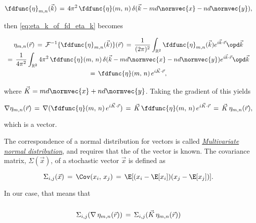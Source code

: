 {\begin{equation} \label{eq:fd_eta_one_dirac}
\fdfunc{\eta}_{m,n}(\vec{k}) \,=\, 4\pi^2\,\fdfunc{\eta}(m,\,n)\,\delta(\vec{k} - md\normvec{x} - nd\normvec{y}),
\end{equation}

then \eqref{eq:eta_k_of_fd_eta_k} becomes

\begin{equation}
\renewcommand*{\arraystretch}{1.5}
\begin{array}{c}
\displaystyle \eta_{m,n}(\vec{r}) \,=\, \mathcal{F}^{-1}\{\fdfunc{\eta}_{m,n}(\vec{k})\}(\vec{r}) \,=\, \frac{1}{(2\pi)^2} \int_{\mathbb{R}^2} \fdfunc{\eta}_{m,n}(\vec{k}) e^{i\vec{k}\cdot\vec{r}}\opd \vec{k} \\
\displaystyle =\, \frac{1}{4\pi^2} \int_{\mathbb{R}^2} 4\pi^2\,\fdfunc{\eta}(m,\,n)\,\delta(\vec{k} - md\normvec{x} - nd\normvec{y}) e^{i\vec{k}\cdot\vec{r}}\opd \vec{k} \\
\displaystyle =\, \fdfunc{\eta}(m,\,n)\,e^{i\vec{K}\cdot\vec{r}},
\end{array}
\end{equation}

where $\vec{K} = md\normvec{x} + nd\normvec{y}$. Taking the gradient of this yields

\begin{equation} \label{eq:grad_eta_one_dirac}
\nabla\eta_{m,n}(\vec{r}) \,=\, \nabla(\fdfunc{\eta}(m,\,n)\,e^{i\vec{K}\cdot\vec{r}}) \,=\, \vec{K}\,\fdfunc{\eta}(m,\,n)\,e^{i\vec{K}\cdot\vec{r}} \,=\, \vec{K}\,\eta_{m,n}(\vec{r}),
\end{equation}

which is a vector.

The correspondence of a normal distribution for vectors is called \textit{\href{http://en.wikipedia.org/wiki/Multivariate\_normal\_distribution\#Non-degenerate\_case}{Multivariate normal distribution}}, and requires that the  of the vector is known. The covariance matrix, $\Sigma(\vec{x})$, of a stochastic vector $\vec{x}$ is defined as

\begin{equation} \label{eq:covariance_matrix_definition}
\Sigma_{i,j}(\vec{x}) \,=\, \Cov(x_i,\,x_j) \,=\, \E[(x_i - \E[x_i])(x_j - \E[x_j])].
\end{equation}

In our case, that means that 

\begin{equation} \label{eq:covariance_matrix_definition}
\renewcommand*{\arraystretch}{2}
\begin{array}{c}
\Sigma_{i,j}(\nabla\,\eta_{m,n}(\vec{r})) \,=\, \Sigma_{i,j}(\vec{K}\,\eta_{m,n}(\vec{r})) \\


\end{array}
\end{equation}}
